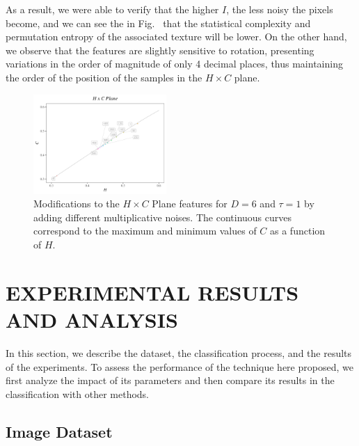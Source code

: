 \documentclass[journal]{IEEEtran}
\begin{document}
\begin{itemize}
    As a result, we were able to verify that the higher $I$, the less noisy the pixels become, and we can see the in Fig.~ that the statistical complexity and permutation entropy of the associated texture will be lower.
    On the other hand, we observe that the features are slightly sensitive to rotation, presenting variations in the order of magnitude of only 4 decimal places, thus maintaining the order of the position of the samples in the $H \times C$ plane.
    
	\begin{figure}[hbt]
		\includegraphics[width=0.45\textwidth]{Figures/waves1.pdf}
		\caption{Modifications to the $H \times C$ Plane features for $D = 6$ and $\tau = 1$ by adding different multiplicative noises.
        The continuous curves correspond to the maximum and minimum values of $C$ as a function of $H$.}
		\label{fig:speckleHC}
	\end{figure}

	\section{EXPERIMENTAL RESULTS AND ANALYSIS}\label{Results}
	
	In this section, we describe the dataset, 
	the classification process, and 
	the results of the experiments.
	To assess the performance of the technique here proposed, we first analyze the impact of its parameters and then compare its results in the classification with other methods.
	
	\subsection{Image Dataset}
	

\end{itemize}
\end{document}
